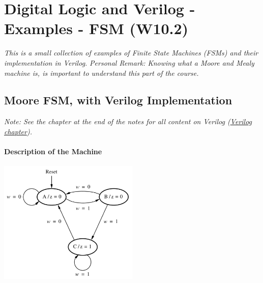 \documentclass[12pt,openany]{book}
\begin{document}
\chapter{Digital Logic and Verilog - Examples - FSM (W10.2)}
\textit{This is a small collection of examples of Finite State Machines (FSMs) and their implementation in Verilog.
}\newline
\textit{Personal Remark: Knowing what a Moore and Mealy machine is, is important to understand this part of the course.}
\section{Moore FSM, with Verilog Implementation}
 \textit{Note: See the chapter at the end of the notes for all content on Verilog (\hyperref[Verilog]{Verilog chapter}).}

\subsubsection*{Description of the Machine}
\begin{center}
	\includegraphics[width=0.5\textwidth]{circuits/17.1.png}
\end{center}
\end{document}
